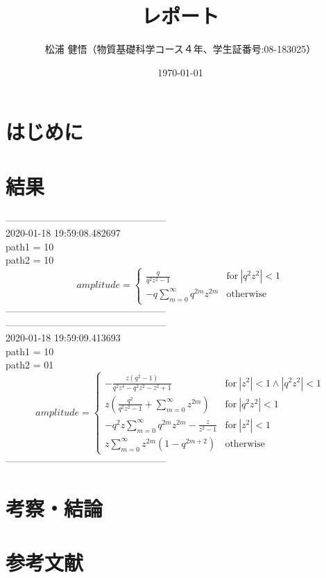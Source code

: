 \documentclass{jsreport}
\begin{document}
\title{レポート}
\author{松浦 健悟（物質基礎科学コース４年、学生証番号:08-183025）}
\date{\today}
\maketitle

\section{はじめに}

\section{}
\section{}

\section{結果}


--------------------------------------------------\\
2020-01-18 19:59:08.482697\\
path1 = 10\\
path2 = 10\\
$$amplitude = \begin{cases} \frac{q}{q^{2} z^{2} - 1} & \text{for}\: \left|{q^{2} z^{2}}\right| < 1 \\- q \sum_{m=0}^{\infty} q^{2 m} z^{2 m} & \text{otherwise} \end{cases}$$
--------------------------------------------------\\
--------------------------------------------------\\
2020-01-18 19:59:09.413693\\
path1 = 10\\
path2 = 01\\
$$amplitude = \begin{cases} - \frac{z \left(q^{2} - 1\right)}{q^{2} z^{4} - q^{2} z^{2} - z^{2} + 1} & \text{for}\: \left|{z^{2}}\right| < 1 \wedge \left|{q^{2} z^{2}}\right| < 1 \\z \left(\frac{q^{2}}{q^{2} z^{2} - 1} + \sum_{m=0}^{\infty} z^{2 m}\right) & \text{for}\: \left|{q^{2} z^{2}}\right| < 1 \\- q^{2} z \sum_{m=0}^{\infty} q^{2 m} z^{2 m} - \frac{z}{z^{2} - 1} & \text{for}\: \left|{z^{2}}\right| < 1 \\z \sum_{m=0}^{\infty} z^{2 m} \left(1 - q^{2 m + 2}\right) & \text{otherwise} \end{cases}$$
--------------------------------------------------\\


\section{考察・結論}
\section{参考文献}
\end{document}
